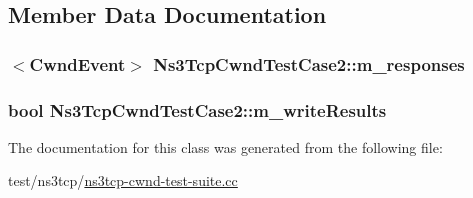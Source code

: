 \subsection{Member Data Documentation}
\subsubsection[{\texorpdfstring{m\+\_\+responses}{m_responses}}]{$<${\bf Cwnd\+Event}$>$ Ns3\+Tcp\+Cwnd\+Test\+Case2\+::m\+\_\+responses\hspace{0.3cm}{\ttfamily [private]}}\hypertarget{classNs3TcpCwndTestCase2_ab2e45e18596ca237cd979daccdcf65b2}{}\label{classNs3TcpCwndTestCase2_ab2e45e18596ca237cd979daccdcf65b2}
\subsubsection[{\texorpdfstring{m\+\_\+write\+Results}{m_writeResults}}]{\setlength{\rightskip}{0pt plus 5cm}bool Ns3\+Tcp\+Cwnd\+Test\+Case2\+::m\+\_\+write\+Results\hspace{0.3cm}{\ttfamily [private]}}\hypertarget{classNs3TcpCwndTestCase2_a93541c9850b39d47ad1d2ebfd640d722}{}\label{classNs3TcpCwndTestCase2_a93541c9850b39d47ad1d2ebfd640d722}


The documentation for this class was generated from the following file\+:\begin{DoxyCompactItemize}
\item 
test/ns3tcp/\hyperlink{ns3tcp-cwnd-test-suite_8cc}{ns3tcp-\/cwnd-\/test-\/suite.\+cc}\end{DoxyCompactItemize}
